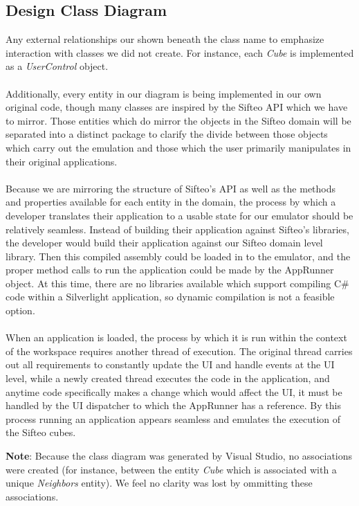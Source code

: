 \documentclass[12pt]{article}
\begin{document}
\subsection{Design Class Diagram}
Any external relationships our shown beneath the class name to emphasize interaction with classes we did not create. For instance, each \textit{Cube} is implemented as a \textit{UserControl} object.
\\\\
Additionally, every entity in our diagram is being implemented in our own original code, though many classes are inspired by the Sifteo API which we have to mirror. Those entities which do mirror the objects in the Sifteo domain will be separated into a distinct package to clarify the divide between those objects which carry out the emulation and those which the user primarily manipulates in their original applications.
\\\\
Because we are mirroring the structure of Sifteo's API as well as the methods and properties available for each entity in the domain, the process by which a developer translates their application to a usable state for our emulator should be relatively seamless. Instead of building their application against Sifteo's libraries, the developer would build their application against our Sifteo domain level library. Then this compiled assembly could be loaded in to the emulator, and the proper method calls to run the application could be made by the AppRunner object. At this time, there are no libraries available which support compiling C# code within a Silverlight application, so dynamic compilation is not a feasible option.
\\\\
When an application is loaded, the process by which it is run within the context of the workspace requires another thread of execution. The original thread carries out all requirements to constantly update the UI and handle events at the UI level, while a newly created thread executes the code in the application, and anytime code specifically makes a change which would affect the UI, it must be handled by the UI dispatcher to which the AppRunner has a reference. By this process running an application appears seamless and emulates the execution of the Sifteo cubes.

\textbf{Note}: Because the class diagram was generated by Visual Studio, no associations were created (for instance, between the entity \textit{Cube} which is associated with a unique \textit{Neighbors} entity). We feel no clarity was lost by ommitting these associations.
\end{document}
